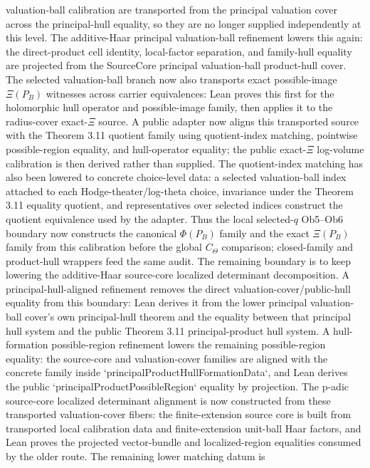 \documentclass[11pt]{article}
\theoremstyle{plain}
\theoremstyle{definition}
\theoremstyle{remark}
\begin{document}
valuation-ball calibration are transported from the principal valuation cover
across the principal-hull equality, so they are no longer supplied
independently at this level.  The additive-Haar principal valuation-ball refinement
lowers this again: the direct-product cell identity, local-factor separation,
and family-hull equality are projected from the SourceCore principal
valuation-ball product-hull cover.  The selected valuation-ball branch now
also transports exact possible-image \(\Xi(P_B)\) witnesses across carrier
equivalences: Lean proves this first for the holomorphic hull operator and
possible-image family, then applies it to the radius-cover exact-\(\Xi\)
source.  A public adapter now aligns this transported source with the
Theorem 3.11 quotient family using quotient-index matching, pointwise
possible-region equality, and hull-operator equality; the public exact-\(\Xi\)
log-volume calibration is then derived rather than supplied.  The quotient-index
matching has also been lowered to concrete choice-level data: a selected
valuation-ball index attached to each Hodge-theater/log-theta choice, invariance
under the Theorem 3.11 equality quotient, and representatives over selected
indices construct the quotient equivalence used by the adapter.  Thus the
local selected-\(q\) Ob5--Ob6 boundary now constructs the canonical
\(\Phi(P_B)\) family and the exact \(\Xi(P_B)\) family from this calibration
before the global \(C_\Theta\) comparison; closed-family and product-hull
wrappers feed the same audit.  The remaining boundary is to keep lowering the
additive-Haar source-core localized determinant decomposition.  A
principal-hull-aligned refinement removes the
direct valuation-cover/public-hull equality from this boundary: Lean derives
it from the lower principal valuation-ball cover's own principal-hull theorem
and the equality between that principal hull system and the public Theorem
3.11 principal-product hull system.  A hull-formation possible-region
refinement lowers the remaining possible-region equality: the source-core and
valuation-cover families are aligned with the concrete family inside
`principalProductHullFormationData`, and Lean derives the public
`principalProductPossibleRegion` equality by projection.  The p-adic
source-core localized determinant alignment is now constructed from these
transported valuation-cover fibers: the finite-extension source core is built
from transported local calibration data and finite-extension unit-ball Haar
factors, and Lean proves the projected vector-bundle and localized-region
equalities consumed by the older route.  The remaining lower matching datum is
\end{document}
